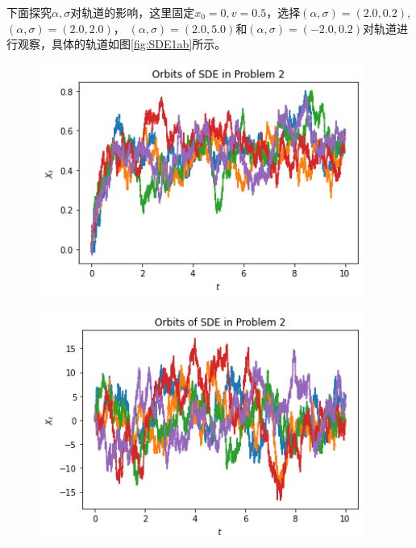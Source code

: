 \documentclass{article}
\begin{document}
下面探究$\alpha, \sigma$对轨道的影响，这里固定$x_0 = 0, v = 0.5$，选择$(\alpha, \sigma) = (2.0, 0.2)$, $(\alpha, \sigma) = (2.0, 2.0)$， $(\alpha, \sigma) = (2.0, 5.0)$和$(\alpha, \sigma) = (-2.0, 0.2)$对轨道进行观察，具体的轨道如图\ref{fig:SDE1ab}所示。 

\begin{figure}[H]
    \centering
    \begin{minipage}[c]{0.45\textwidth}
        \centering
        \includegraphics[width=0.95\textwidth]{figures/SDE1 Orbit1.png}
        \label{fig:SDE1ab-a}
    \end{minipage}
    \begin{minipage}[c]{0.45\textwidth}
        \centering
        \includegraphics[width=0.95\textwidth]{figures/SDE1 Orbit4.png}
        \label{fig:SDE1ab-b}

\end{minipage}
\end{figure}
\end{document}
